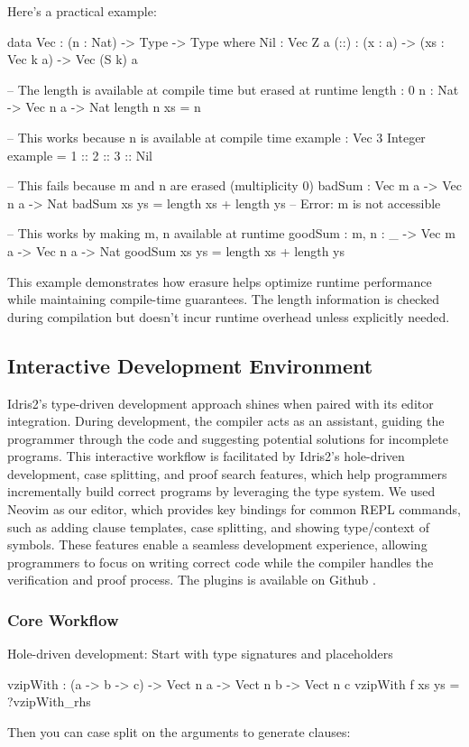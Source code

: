 \documentclass[]{rptuseminar}
\begin{document}
Here's a practical example:

\begin{idris}
data Vec : (n : Nat) -> Type -> Type where
Nil : Vec Z a
(::) : (x : a) -> (xs : Vec k a) -> Vec (S k) a

-- The length is available at compile time but erased at runtime
length : {0 n : Nat} -> Vec n a -> Nat
length {n} xs = n

-- This works because n is available at compile time
example : Vec 3 Integer
example = 1 :: 2 :: 3 :: Nil

-- This fails because m and n are erased (multiplicity 0)
badSum : Vec m a -> Vec n a -> Nat
badSum xs ys = length xs + length ys -- Error: m is not accessible

-- This works by making m, n available at runtime
goodSum : {m, n : _} -> Vec m a -> Vec n a -> Nat
goodSum xs ys = length xs + length ys
\end{idris}

This example demonstrates how erasure helps optimize runtime performance while maintaining compile-time guarantees. The length information is checked during compilation but doesn't incur runtime overhead unless explicitly needed.

\subsection{Interactive Development Environment}  
Idris2's type-driven development approach shines when paired with its editor integration. During development, the compiler acts as an assistant, guiding the programmer through the code and suggesting potential solutions for incomplete programs. This interactive workflow is facilitated by Idris2's hole-driven development, case splitting, and proof search features, which help programmers incrementally build correct programs by leveraging the type system.
We used Neovim as our editor, which provides key bindings for common REPL commands, such as adding clause templates, case splitting, and showing type/context of symbols. These features enable a seamless development experience, allowing programmers to focus on writing correct code while the compiler handles the verification and proof process.
The plugins is available on Github \cite{repo_key}.

\subsubsection{Core Workflow}
Hole-driven development: Start with type signatures and placeholders
\begin{idris}
vzipWith : (a -> b -> c) -> Vect n a -> Vect n b -> Vect n c
vzipWith f xs ys = ?vzipWith_rhs
\end{idris}
Then you can case split on the arguments to generate clauses:
\end{document}
